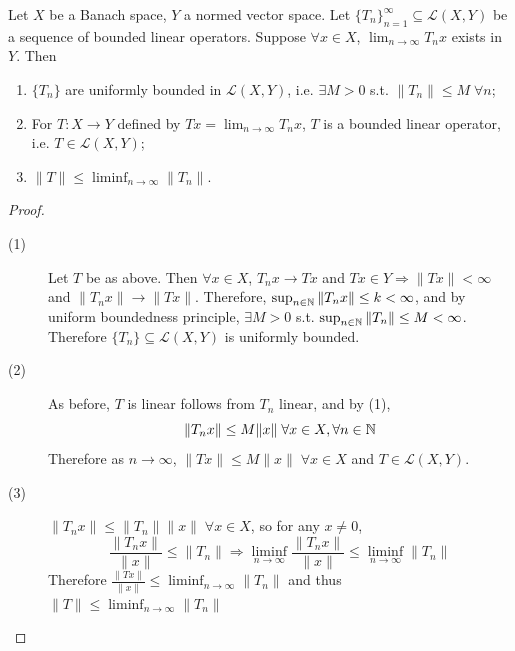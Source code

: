 \begin{thm}
    Let $X$ be a Banach space, $Y$ a normed vector space. Let $\{ T_n \}_{n=1}^{\infty} \subseteq 
    \mathcal{L}(X, Y)$ be a sequence of bounded linear operators. Suppose $\forall x \in X$,
    $\lim_{n \to \infty} T_n x$ exists in $Y$. Then
    \begin{enumerate}
        \item $\{ T_n \}$ are uniformly bounded in $\mathcal{L}(X, Y)$, 
        i.e. $\exists M > 0$ s.t. $\| T_n \| \leq M \; \forall n$;
        \item For $T : X \to Y$ defined by $T x = \lim_{n \to \infty} T_n x$, $T$ is a bounded linear operator, 
        i.e. $T \in \mathcal{L}(X, Y)$;
        \item $\| T \| \leq \liminf_{n \to \infty} \| T_n \|$.
    \end{enumerate}  
\end{thm}

\begin{proof}
    \leavevmode
    \begin{description}
        \item[(1)] Let $T$ be as above. Then $\forall x \in X$, $T_n x \to T x$ and 
        $T x \in Y \Rightarrow \| T x\| < \infty $ and $\| T_n x \| \to \| T x\| $.
        Therefore, $\sup_{n \in \mathbb{N}} \| T_n x \| \leq k < \infty$, and by uniform boundedness
        principle, $\exists M > 0$ s.t. $\sup_{n \in \mathbb{N}} \| T_n \| \leq M < \infty$.
        Therefore $\{ T_n \} \subseteq \mathcal{L}(X, Y)$ is uniformly bounded.    
        \item[(2)] As before, $T$ is linear follows from $T_n$ linear, and by (1),
        \[
            \| T_n x \| \leq M \| x \| \; \forall x \in X, \forall n \in \mathbb{N} 
        \]  
        Therefore as $n \to \infty$, $\| T x \| \leq M \| x \| \; \forall x \in X$ and 
        $T \in \mathcal{L}(X, Y)$.
        \item[(3)] $\| T_n x \| \leq \| T_n \| \| x \| \; \forall x \in X$, so for any $x \neq 0$,
        \[
            \frac{\| T_n x \| }{\| x \| } \leq \| T_n \| \Rightarrow \liminf_{n \to \infty}
            \frac{\| T_n x \| }{\| x \| } \leq \liminf_{n \to \infty} \| T_n \|
        \]   
        Therefore $\frac{\| T x \| }{\| x \| } \leq \liminf_{n \to \infty} \| T_n \| $ and thus
        $\| T \| \leq \liminf_{n \to \infty} \| T_n \| $  \qedhere
    \end{description}
\end{proof}

